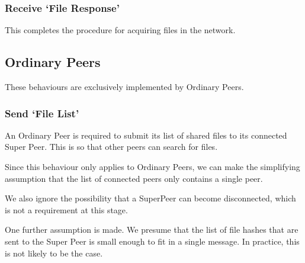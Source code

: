 \subsubsection{Receive `File Response'}

This completes the procedure for acquiring files in the network.

\begin{algorithm}[H]

\end{algorithm}

\subsection{Ordinary Peers}

These behaviours are exclusively implemented by Ordinary Peers.

\subsubsection{Send `File List'}

An Ordinary Peer is required to submit its list of shared files to its connected
Super Peer.  This is so that other peers can search for files.

Since this behaviour only applies to Ordinary Peers, we can make the simplifying
assumption that the list of connected peers only contains a single peer.

We also ignore the possibility that a SuperPeer can become disconnected, which
is not a requirement at this stage.

One further assumption is made.  We presume that the list of file hashes that
are sent to the Super Peer is small enough to fit in a single message. In
practice, this is not likely to be the case.

\begin{algorithm}[H]

\end{algorithm}


